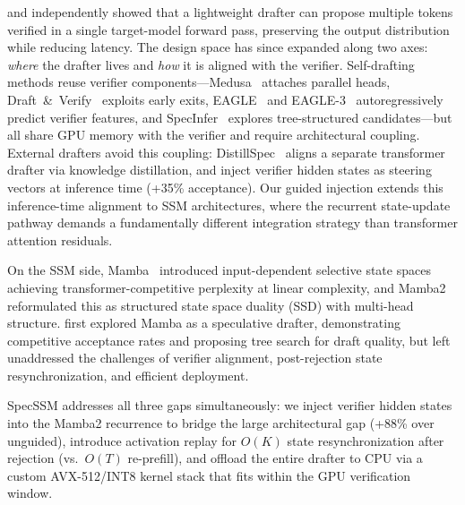 \citet{leviathan2023fast} and \citet{chen2023accelerating} independently showed that a lightweight drafter can propose multiple tokens verified in a single target-model forward pass, preserving the output distribution while reducing latency.
The design space has since expanded along two axes: \emph{where} the drafter lives and \emph{how} it is aligned with the verifier.
Self-drafting methods reuse verifier components---Medusa~\citep{cai2024medusa} attaches parallel heads, Draft~\&~Verify~\citep{zhang2024draft} exploits early exits, EAGLE~\citep{li2024eagle} and EAGLE-3~\citep{li2024eagle3} autoregressively predict verifier features, and SpecInfer~\citep{miao2024specinfer} explores tree-structured candidates---but all share GPU memory with the verifier and require architectural coupling.
External drafters avoid this coupling: DistillSpec~\citep{zhou2023distillspec} aligns a separate transformer drafter via knowledge distillation, and \citet{berdoz2026steering} inject verifier hidden states as steering vectors at inference time (+35\% acceptance).
Our guided injection extends this inference-time alignment to SSM architectures, where the recurrent state-update pathway demands a fundamentally different integration strategy than transformer attention residuals.

On the SSM side, Mamba~\citep{gu2023mamba} introduced input-dependent selective state spaces achieving transformer-competitive perplexity at linear complexity, and Mamba2~\citep{dao2024transformers} reformulated this as structured state space duality (SSD) with multi-head structure.
\citet{choi2025mamba} first explored Mamba as a speculative drafter, demonstrating competitive acceptance rates and proposing tree search for draft quality, but left unaddressed the challenges of verifier alignment, post-rejection state resynchronization, and efficient deployment.

SpecSSM addresses all three gaps simultaneously: we inject verifier hidden states into the Mamba2 recurrence to bridge the large architectural gap (+88\% over unguided), introduce activation replay for $O(K)$ state resynchronization after rejection (vs.\ $O(T)$ re-prefill), and offload the entire drafter to CPU via a custom AVX-512/INT8 kernel stack that fits within the GPU verification window.
